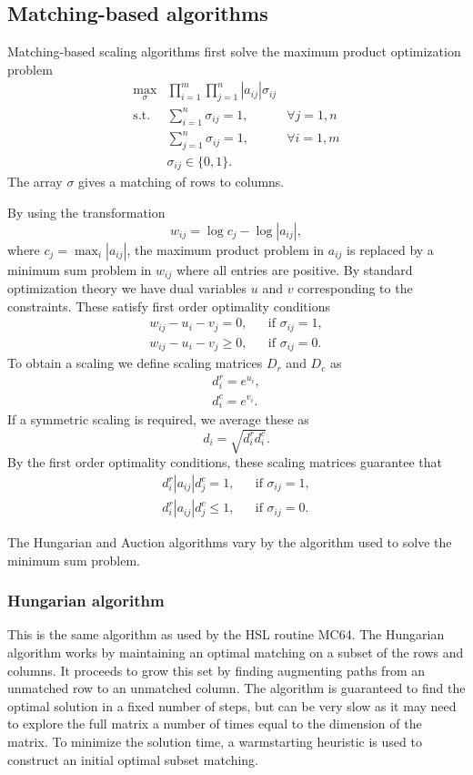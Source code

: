 \subsection{Matching-based algorithms}

Matching-based scaling algorithms first solve the maximum product optimization
problem
\begin{eqnarray*}
   \max_{\sigma} & \prod_{i=1}^m\prod_{j=1}^n |a_{ij}|\sigma_{ij} & \\
   \mathrm{s.t.} & \sum_{i=1}^n\sigma_{ij} = 1, & \forall j=1,n \\
                 & \sum_{j=1}^n\sigma_{ij} = 1, & \forall i=1,m \\
                 & \sigma_{ij} \in \{0,1\}.
\end{eqnarray*}
The array $\sigma$ gives a matching of rows to columns.

By using the transformation
$$
   w_{ij} = \log c_j - \log |a_{ij}|,
$$
where $c_j = \max_i |a_{ij}|$, the maximum product problem in $a_{ij}$ is
replaced by a minimum sum problem in $w_{ij}$ where all entries are positive.
By standard optimization theory we have dual variables $u$ and $v$ corresponding
to the constraints. These satisfy first order optimality conditions
\begin{eqnarray*}
   w_{ij} - u_i - v_j = 0, && \mbox{if } \sigma_{ij }=1, \\
   w_{ij} - u_i - v_j \ge 0, && \mbox{if } \sigma_{ij }=0.
\end{eqnarray*}
To obtain a scaling we define scaling matrices $D_r$ and $D_c$ as
\begin{eqnarray*}
   & d^r_i = e^{u_i}, & \\
   & d^c_i = e^{v_i}. &
\end{eqnarray*}
If a symmetric scaling is required, we average these as
$$
   d_i = \sqrt{d^r_id^c_i}.
$$
By the first order optimality conditions, these scaling matrices guarantee that
\begin{eqnarray*}
   d^r_i|a_{ij}|d^c_j = 1, && \mbox{if } \sigma_{ij}=1, \\
   d^r_i|a_{ij}|d^c_j \le 1, && \mbox{if } \sigma_{ij}=0.
\end{eqnarray*}

The Hungarian and Auction algorithms vary by the algorithm used to solve the
minimum sum problem.

\subsubsection{Hungarian algorithm}
This is the same algorithm as used by the HSL routine MC64.
The Hungarian algorithm works by maintaining an optimal matching on a subset of
the rows and columns. It proceeds to grow this set by finding augmenting paths
from an unmatched row to an unmatched column. The algorithm is guaranteed to
find the optimal solution in a fixed number of steps, but can be very slow as
it may need to explore the full matrix a number of times equal to the dimension
of the matrix. To minimize the solution time, a warmstarting heuristic is used
to construct an initial optimal subset matching.

